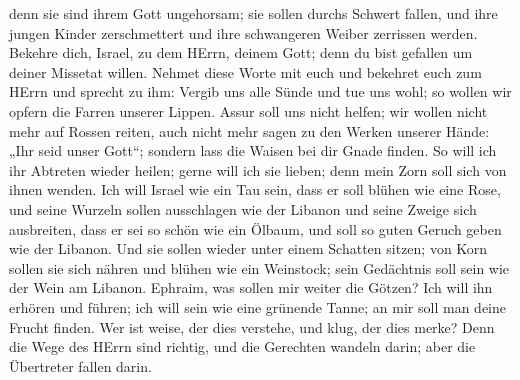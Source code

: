 denn sie sind ihrem Gott ungehorsam; sie sollen durchs Schwert fallen,
und ihre jungen Kinder zerschmettert und ihre schwangeren Weiber
zerrissen werden.  Bekehre dich, Israel, zu dem HErrn,
deinem Gott; denn du bist gefallen um deiner Missetat willen.
 Nehmet diese Worte mit euch und bekehret euch zum HErrn und
sprecht zu ihm: Vergib uns alle Sünde und tue uns wohl; so wollen wir
opfern die Farren unserer Lippen.  Assur soll uns nicht
helfen; wir wollen nicht mehr auf Rossen reiten, auch nicht mehr sagen
zu den Werken unserer Hände: „Ihr seid unser Gott``; sondern lass die
Waisen bei dir Gnade finden.  So will ich ihr Abtreten
wieder heilen; gerne will ich sie lieben; denn mein Zorn soll sich von
ihnen wenden.  Ich will Israel wie ein Tau sein, dass er
soll blühen wie eine Rose, und seine Wurzeln sollen ausschlagen wie der
Libanon  und seine Zweige sich ausbreiten, dass er sei so
schön wie ein Ölbaum, und soll so guten Geruch geben wie der Libanon.
 Und sie sollen wieder unter einem Schatten sitzen; von Korn
sollen sie sich nähren und blühen wie ein Weinstock; sein Gedächtnis
soll sein wie der Wein am Libanon.  Ephraim, was sollen mir
weiter die Götzen? Ich will ihn erhören und führen; ich will sein wie
eine grünende Tanne; an mir soll man deine Frucht finden. 
Wer ist weise, der dies verstehe, und klug, der dies merke? Denn die
Wege des HErrn sind richtig, und die Gerechten wandeln darin; aber die
Übertreter fallen darin.
